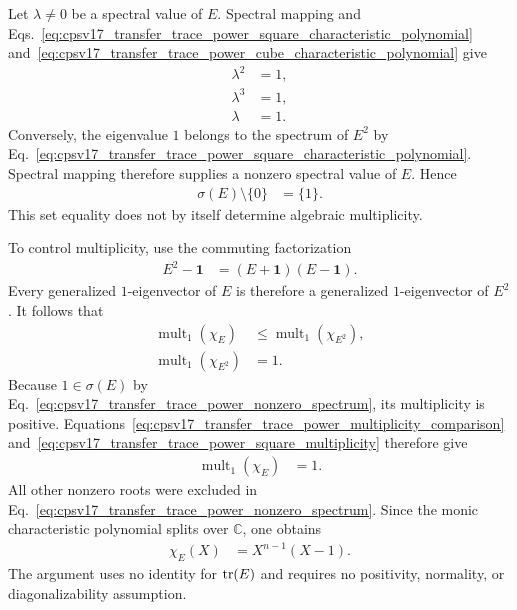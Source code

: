 \documentclass{article}
\begin{document}
Let $\lambda\neq0$ be a spectral value of $E$. Spectral mapping and
Eqs.~\ref{eq:cpsv17_transfer_trace_power_square_characteristic_polynomial}
and~\ref{eq:cpsv17_transfer_trace_power_cube_characteristic_polynomial} give
\begin{align}
    \lambda^2
        &= 1,
    \label{eq:cpsv17_transfer_trace_power_square_spectral_constraint}\\
    \lambda^3
        &= 1,
    \label{eq:cpsv17_transfer_trace_power_cube_spectral_constraint}\\
    \lambda
        &= 1.
    \label{eq:cpsv17_transfer_trace_power_nonzero_spectral_value}
\end{align}
Conversely, the eigenvalue $1$ belongs to the spectrum of $E^2$ by
Eq.~\ref{eq:cpsv17_transfer_trace_power_square_characteristic_polynomial}.
Spectral mapping therefore supplies a nonzero spectral value of $E$. Hence
\begin{align}
    \sigma(E)\setminus\{0\}
        &= \{1\}.
    \label{eq:cpsv17_transfer_trace_power_nonzero_spectrum}
\end{align}
This set equality does not by itself determine algebraic multiplicity.

To control multiplicity, use the commuting factorization
\begin{align}
    E^2-\mathbf 1
        &= (E+\mathbf 1)(E-\mathbf 1).
    \label{eq:cpsv17_transfer_trace_power_square_factorization}
\end{align}
Every generalized $1$-eigenvector of $E$ is therefore a generalized
$1$-eigenvector of $E^2$. It follows that
\begin{align}
    \operatorname{mult}_1(\chi_E)
        &\leq \operatorname{mult}_1(\chi_{E^2}),
    \label{eq:cpsv17_transfer_trace_power_multiplicity_comparison}\\
    \operatorname{mult}_1(\chi_{E^2})
        &= 1.
    \label{eq:cpsv17_transfer_trace_power_square_multiplicity}
\end{align}
Because $1\in\sigma(E)$ by
Eq.~\ref{eq:cpsv17_transfer_trace_power_nonzero_spectrum}, its multiplicity is
positive. Equations~\ref{eq:cpsv17_transfer_trace_power_multiplicity_comparison}
and~\ref{eq:cpsv17_transfer_trace_power_square_multiplicity} therefore give
\begin{align}
    \operatorname{mult}_1(\chi_E)
        &= 1.
    \label{eq:cpsv17_transfer_trace_power_unit_multiplicity}
\end{align}
All other nonzero roots were excluded in
Eq.~\ref{eq:cpsv17_transfer_trace_power_nonzero_spectrum}. Since the monic
characteristic polynomial splits over $\mathbb C$, one obtains
\begin{align}
    \chi_E(X)
        &= X^{n-1}(X-1).
    \label{eq:cpsv17_transfer_trace_power_derived_characteristic_polynomial}
\end{align}
The argument uses no identity for $\operatorname{tr}(E)$ and requires no positivity,
normality, or diagonalizability assumption.
\end{document}
